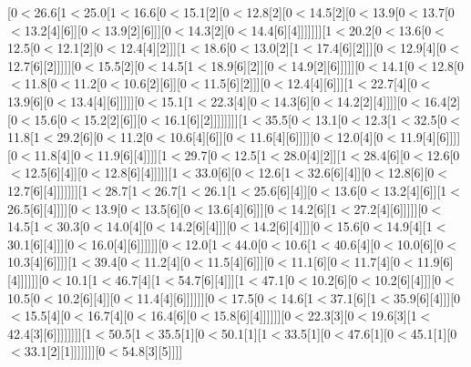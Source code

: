 [0$<$26.6[1$<$25.0[1$<$16.6[0$<$15.1[2][0$<$12.8[2][0$<$14.5[2][0$<$13.9[0$<$13.7[0$<$13.2[4][6]][0$<$13.9[2][6]]][0$<$14.3[2][0$<$14.4[6][4]]]]]]][1$<$20.2[0$<$13.6[0$<$12.5[0$<$12.1[2][0$<$12.4[4][2]]][1$<$18.6[0$<$13.0[2][1$<$17.4[6][2]]][0$<$12.9[4][0$<$12.7[6][2]]]]][0$<$15.5[2][0$<$14.5[1$<$18.9[6][2]][0$<$14.9[2][6]]]]][0$<$14.1[0$<$12.8[0$<$11.8[0$<$11.2[0$<$10.6[2][6]][0$<$11.5[6][2]]][0$<$12.4[4][6]]][1$<$22.7[4][0$<$13.9[6][0$<$13.4[4][6]]]]][0$<$15.1[1$<$22.3[4][0$<$14.3[6][0$<$14.2[2][4]]]][0$<$16.4[2][0$<$15.6[0$<$15.2[2][6]][0$<$16.1[6][2]]]]]]]][1$<$35.5[0$<$13.1[0$<$12.3[1$<$32.5[0$<$11.8[1$<$29.2[6][0$<$11.2[0$<$10.6[4][6]][0$<$11.6[4][6]]]][0$<$12.0[4][0$<$11.9[4][6]]]][0$<$11.8[4][0$<$11.9[6][4]]]][1$<$29.7[0$<$12.5[1$<$28.0[4][2]][1$<$28.4[6][0$<$12.6[0$<$12.5[6][4]][0$<$12.8[6][4]]]]][1$<$33.0[6][0$<$12.6[1$<$32.6[6][4]][0$<$12.8[6][0$<$12.7[6][4]]]]]]][1$<$28.7[1$<$26.7[1$<$26.1[1$<$25.6[6][4]][0$<$13.6[0$<$13.2[4][6]][1$<$26.5[6][4]]]][0$<$13.9[0$<$13.5[6][0$<$13.6[4][6]]][0$<$14.2[6][1$<$27.2[4][6]]]]][0$<$14.5[1$<$30.3[0$<$14.0[4][0$<$14.2[6][4]]][0$<$14.2[6][4]]][0$<$15.6[0$<$14.9[4][1$<$30.1[6][4]]][0$<$16.0[4][6]]]]]][0$<$12.0[1$<$44.0[0$<$10.6[1$<$40.6[4][0$<$10.0[6][0$<$10.3[4][6]]]][1$<$39.4[0$<$11.2[4][0$<$11.5[4][6]]][0$<$11.1[6][0$<$11.7[4][0$<$11.9[6][4]]]]]][0$<$10.1[1$<$46.7[4][1$<$54.7[6][4]]][1$<$47.1[0$<$10.2[6][0$<$10.2[6][4]]][0$<$10.5[0$<$10.2[6][4]][0$<$11.4[4][6]]]]]][0$<$17.5[0$<$14.6[1$<$37.1[6][1$<$35.9[6][4]]][0$<$15.5[4][0$<$16.7[4][0$<$16.4[6][0$<$15.8[6][4]]]]]][0$<$22.3[3][0$<$19.6[3][1$<$42.4[3][6]]]]]]]][1$<$50.5[1$<$35.5[1][0$<$50.1[1][1$<$33.5[1][0$<$47.6[1][0$<$45.1[1][0$<$33.1[2][1]]]]]]][0$<$54.8[3][5]]]]
